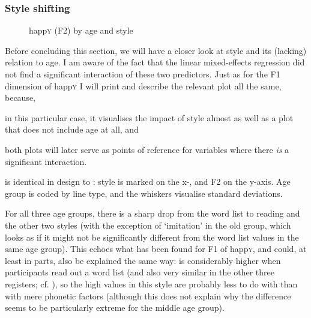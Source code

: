 \subsubsection{Style shifting}
\label{sec.prod.res.vow.happy.f2.shifting}

\begin{figure}
	
		\resizebox{.5\linewidth}{!}{} 
	\caption{happ\textsc{y} (F2) by age and style}
	\label{fig.line.f2w.happy.tot}
\end{figure}

Before concluding this section, we will have a closer look at style and its (lacking) relation to age.
I am aware of the fact that the linear mixed-effects regression did not find a significant interaction of these two predictors.
Just as for the F1 dimension of happ\textsc{y} I will print and describe the relevant plot all the same, because,
\begin{inparaenum}[(a)]
	\item in this particular case, it visualises the impact of style almost as well as a plot that does not include age at all, and
	\item both plots will later serve as points of reference for variables where there \emph{is} a significant interaction.
\end{inparaenum}
 is identical in design to : style is marked on the x-, and F2 on the y-axis.
Age group is coded by line type, and the whiskers visualise standard deviations.

For all three age groups, there is a sharp drop from the word list to reading and the other two styles (with the exception of `imitation' in the old group, which looks as if it might not be significantly different from the word list values in the same age group).
This echoes what has been found for F1 of happ\textsc{y}, and could, at least in parts, also be explained the same way:  is considerably higher when participants read out a word list (and also very similar in the other three registers; cf. ), so the high values in this style are probably less to do with  than with mere phonetic factors (although this does not explain why the difference seems to be particularly extreme for the middle age group).


